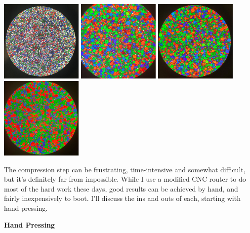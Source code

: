 \documentclass[11pt]{article}
\begin{document}
\begin{center}
\includegraphics[width=4cm, height=4cm]{img/part1_20.jpg}
\includegraphics[width=4cm, height=4cm]{img/part1_21.jpg}
\includegraphics[width=4cm, height=4cm]{img/part1_22.jpg}
\includegraphics[width=4cm, height=4cm]{img/part1_23.jpg}
\end{center}

The compression step can be frustrating, time-intensive and somewhat difficult, but it's definitely far from impossible. While I use a modified CNC router to do most of the hard work these days, good results can be achieved by hand, and fairly inexpensively to boot. I'll discuss the ins and outs of each, starting with hand pressing.\newline

\textbf{Hand Pressing}\newline
\end{document}
